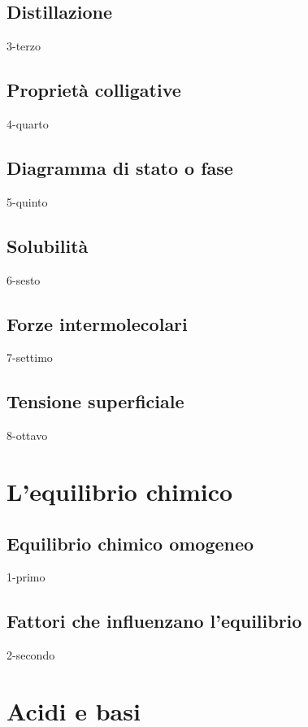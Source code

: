 \documentclass[openany,12pt]{book}%
\begin{document}
\section{Distillazione}
{3-terzo}

\section{Proprietà colligative}
{4-quarto}

\newpage

\section{Diagramma di stato o fase}
{5-quinto}

\newpage

\section{Solubilità}
{6-sesto}

\newpage

\section{Forze intermolecolari}
{7-settimo}

\section{Tensione superficiale}
{8-ottavo}

\chapter{L'equilibrio chimico}

\section{Equilibrio chimico omogeneo}
{1-primo}

\section{Fattori che influenzano l'equilibrio}
{2-secondo}

\chapter{Acidi e basi}
\end{document}
